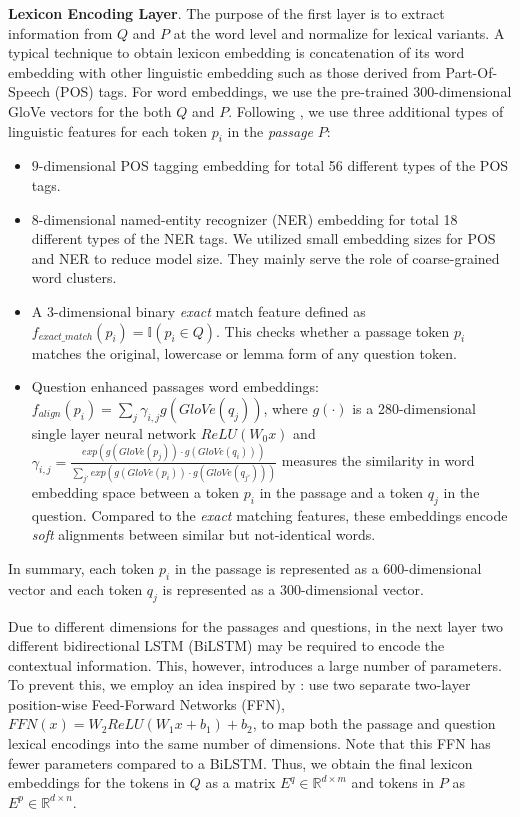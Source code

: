 \documentclass[11pt,a4paper]{article}
\begin{document}
\textbf{Lexicon Encoding Layer}. 
The purpose of the first layer is to extract information from $Q$ and $P$ at the word level and normalize for lexical variants.
A typical technique to obtain lexicon embedding is concatenation of its word embedding with other linguistic embedding such as those derived from Part-Of-Speech (POS) tags. 
For word embeddings, we use the pre-trained 300-dimensional GloVe vectors \cite{pennington2014glove} for the both $Q$ and $P$.
Following , we use three additional types of linguistic features for each token $p_i$ in the \textit{passage} $P$:
\begin{itemize}
\item $9$-dimensional POS tagging embedding for total 56 different types of the POS tags.\vspace{-0.2cm}
\item $8$-dimensional named-entity recognizer (NER) embedding for total 18 different types of the NER tags. We utilized small embedding sizes for POS and NER to reduce model size. They mainly serve the role of coarse-grained word clusters.
\item A $3$-dimensional binary \textit{exact} match feature defined as $f_{exact\_match}(p_i)= \mathbb{I}(p_i \in Q)$. This checks whether a passage token $p_i$ matches the original, lowercase or lemma form of any question token.
\item Question enhanced passages word embeddings: $f_{align}(p_i)=\sum_{j}\gamma_{i,j}g(GloVe(q_j))$, where $g(\cdot)$ is a 280-dimensional single layer neural network $ReLU(W_0x)$ and $\gamma_{i,j}=\frac{exp(g(GloVe(p_j))\cdot g(GloVe(q_i)))}{\sum_{j'}exp(g(GloVe(p_i))\cdot g(GloVe(q_{j'})))}$ measures the similarity in word embedding space between a token $p_i$ in the passage and a token $q_j$ in the question. Compared to the \textit{exact} matching features, these embeddings encode \textit{soft} alignments between similar but not-identical words.

\end{itemize}
In summary, each token $p_i$ in the passage is represented as a 600-dimensional vector and each token $q_j$ is represented as a 300-dimensional vector. 

Due to different dimensions for the passages and questions, in the next layer two different bidirectional LSTM (BiLSTM) \cite{hochreiter1997long} may be required to encode the contextual information. 
This, however, introduces a large number of parameters.
To prevent this, we employ an idea inspired by \cite{vaswani2017attention}: use two separate two-layer position-wise Feed-Forward Networks (FFN), $FFN(x)=W_2 ReLU(W_1 x +b_1) + b_2$, to map both the passage and question lexical encodings into the same number of dimensions. Note that this FFN has fewer parameters compared to a BiLSTM.
Thus, we obtain the final lexicon embeddings for the tokens in $Q$ as a matrix $E^q \in \mathbb{R}^{d \times m}$ and tokens in $P$ as $E^p\in \mathbb{R}^{d \times n}$. 
\end{document}
